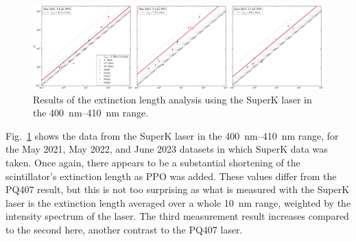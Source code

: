 \begin{figure}
    \centering
    \includegraphics[width=\textwidth]{5_SMELLIEAnalysis/images/rsrw_plot_combined_superK[400,410].pdf}
    \caption[Results of the extinction length analysis using the SuperK laser in the \SIrange{400}{410}{\nm} range]
    {Results of the extinction length analysis using the SuperK laser in the \SIrange{400}{410}{\nm} range.}
    \label{fig:smellie_ext_length_results_SK_400410}
\end{figure}

Fig.~\ref{fig:smellie_ext_length_results_SK_400410} shows the data from the SuperK laser in the \SIrange{400}{410}{\nm} range, for the May 2021, May 2022, and June 2023 datasets in which SuperK data was taken. Once again, there appears to be a substantial shortening of the scintillator's extinction length as PPO was added. These values differ from the PQ407 result, but this is not too surprising as what is measured with the SuperK laser is the extinction length averaged over a whole \SI{10}{\nm} range, weighted by the intensity spectrum of the laser. The third measurement result increases compared to the second here, another contrast to the PQ407 laser.


